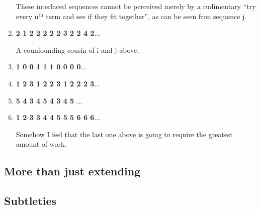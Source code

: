 \documentclass{article}
\begin{document}
\begin{enumerate}
These interlaced sequences cannot be perceived merely by a rudimentary ``try every n$^\textrm{th}$ term and see if they fit together'', as can be seen fron sequence j.

\item \textbf{ 2 1 2 2 2 2 2 3 2 2 4 2$\ldots$}

A counfounding cousin of i and j above.

\item \textbf{ 1 0 0 1 1 1 0 0 0 0$\ldots$}
\item \textbf{ 1 2 3 1 2 2 3 1 2 2 2 3$\ldots$}
\item \textbf{ 5 4 3 4 5 4 3 4 5 $\ldots$}
\item \textbf{ 1 2 3 3 4 4 5 5 5 6 6 6$\ldots$}

Somehow I feel that the last one above is going to require the greatest amount of work.
\end{enumerate}

\subsection{More than just extending}
\label{sec:more}


\subsection{Subtleties}
\label{sec:subtleties}



\end{document}
